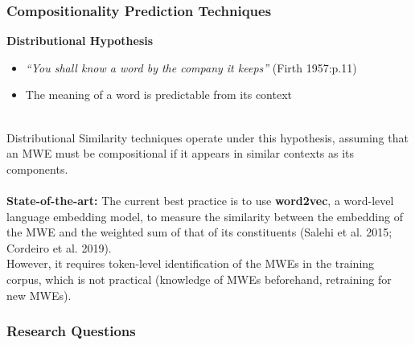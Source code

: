 \documentclass{beamer}
\begin{document}
\begin{frame}
\frametitle{Compositionality Prediction Techniques}
\textbf{Distributional Hypothesis}
\begin{itemize}
    \item \textit{``You shall know a word by the company it keeps''} (Firth 1957:p.11)
    \item The meaning of a word is predictable from its context
\end{itemize} \\
Distributional Similarity techniques operate under this hypothesis, assuming that an MWE must be compositional if it appears in similar contexts as its components.
\\~\\
\textbf{State-of-the-art:} The current best practice is to use \textbf{word2vec}, a word-level language embedding model, to measure the similarity between
the embedding of the MWE and the weighted sum of that of its constituents (Salehi et al. 2015; Cordeiro et al. 2019). \\
However, it requires token-level identification of the MWEs in the training corpus, which is not practical (knowledge of MWEs beforehand, retraining for new MWEs).
\end{frame}

\begin{frame}
\frametitle{Research Questions}
 \\~\\
\end{frame}
\end{document}
